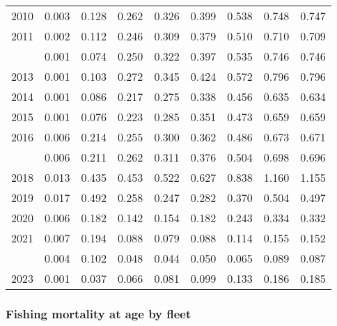\documentclass[
]{article}
\begin{document}
\begin{longtable}[t]{lrrrrrrrr}
2010 & 0.003 & 0.128 & 0.262 & 0.326 & 0.399 & 0.538 & 0.748 & 0.747\\
2011 & 0.002 & 0.112 & 0.246 & 0.309 & 0.379 & 0.510 & 0.710 & 0.709\\
\addlinespace
2012 & 0.001 & 0.074 & 0.250 & 0.322 & 0.397 & 0.535 & 0.746 & 0.746\\
2013 & 0.001 & 0.103 & 0.272 & 0.345 & 0.424 & 0.572 & 0.796 & 0.796\\
2014 & 0.001 & 0.086 & 0.217 & 0.275 & 0.338 & 0.456 & 0.635 & 0.634\\
2015 & 0.001 & 0.076 & 0.223 & 0.285 & 0.351 & 0.473 & 0.659 & 0.659\\
2016 & 0.006 & 0.214 & 0.255 & 0.300 & 0.362 & 0.486 & 0.673 & 0.671\\
\addlinespace
2017 & 0.006 & 0.211 & 0.262 & 0.311 & 0.376 & 0.504 & 0.698 & 0.696\\
2018 & 0.013 & 0.435 & 0.453 & 0.522 & 0.627 & 0.838 & 1.160 & 1.155\\
2019 & 0.017 & 0.492 & 0.258 & 0.247 & 0.282 & 0.370 & 0.504 & 0.497\\
2020 & 0.006 & 0.182 & 0.142 & 0.154 & 0.182 & 0.243 & 0.334 & 0.332\\
2021 & 0.007 & 0.194 & 0.088 & 0.079 & 0.088 & 0.114 & 0.155 & 0.152\\
\addlinespace
2022 & 0.004 & 0.102 & 0.048 & 0.044 & 0.050 & 0.065 & 0.089 & 0.087\\
2023 & 0.001 & 0.037 & 0.066 & 0.081 & 0.099 & 0.133 & 0.186 & 0.185\\*
\end{longtable}

\subsubsection{Fishing mortality at age by
fleet}\label{fishing-mortality-at-age-by-fleet}
\end{document}
